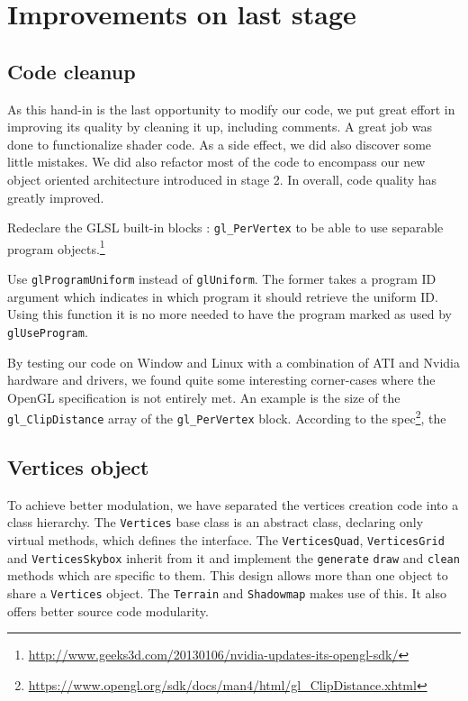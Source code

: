 \documentclass[a4paper,11pt]{article}
\begin{document}
\section{Improvements on last stage}

\subsection{Code cleanup}

As this hand-in is the last opportunity to modify our code, we put great effort in improving its quality by cleaning it up, including comments. A great job was done to functionalize shader code. As a side effect, we did also discover some little mistakes. We did also refactor most of the code to encompass our new object oriented architecture introduced in stage 2. In overall, code quality has greatly improved.

Redeclare the GLSL built-in blocks : \texttt{gl\_PerVertex} to be able to use separable program objects.\footnote{\url{http://www.geeks3d.com/20130106/nvidia-updates-its-opengl-sdk/}}

Use \texttt{glProgramUniform} instead of \texttt{glUniform}. The former takes a program ID argument which indicates in which program it should retrieve the uniform ID. Using this function it is no more needed to have the program marked as used by \texttt{glUseProgram}.

By testing our code on Window and Linux with a combination of ATI and Nvidia hardware and drivers, we found quite some interesting corner-cases where the OpenGL specification is not entirely met. An example is the size of the \texttt{gl\_ClipDistance} array of the \texttt{gl\_PerVertex} block. According to the spec\footnote{\url{https://www.opengl.org/sdk/docs/man4/html/gl\_ClipDistance.xhtml}}, the

\subsection{Vertices object}

To achieve better modulation, we have separated the vertices creation code into a class hierarchy. The \texttt{Vertices} base class is an abstract class, declaring only virtual methods, which defines the interface. The \texttt{VerticesQuad}, \texttt{VerticesGrid} and \texttt{VerticesSkybox} inherit from it and implement the \texttt{generate} \texttt{draw} and \texttt{clean} methods which are specific to them. This design allows more than one  object to share a \texttt{Vertices} object. The \texttt{Terrain} and \texttt{Shadowmap} makes use of this. It also offers better source code modularity.
\end{document}
